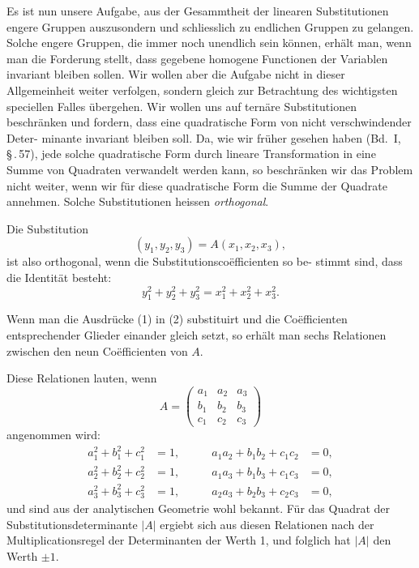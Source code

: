 \documentclass[12pt,a4paper]{article}
\theoremstyle{plain}
\theoremstyle{definition}
\theoremstyle{remark}
\begin{document}
Es ist nun unsere Aufgabe, aus der Gesammtheit der linearen
Substitutionen engere Gruppen auszusondern und schliesslich
zu endlichen Gruppen zu gelangen. Solche engere Gruppen, die
immer noch unendlich sein k\"onnen, erh\"alt man, wenn man die
Forderung stellt, dass gegebene homogene Functionen der
Variablen invariant bleiben sollen. Wir wollen aber die Aufgabe
nicht in dieser Allgemeinheit weiter verfolgen, sondern gleich
zur Betrachtung des wichtigsten speciellen Falles \"ubergehen. Wir
wollen uns auf tern\"are Substitutionen beschr\"anken und fordern,
dass eine quadratische Form von nicht verschwindender Deter-
minante invariant bleiben soll. Da, wie wir fr\"uher gesehen
haben (Bd.~I, \S\,.\,57), jede solche quadratische Form durch lineare
Transformation in eine Summe von Quadraten verwandelt werden
kann, so beschr\"anken wir das Problem nicht weiter, wenn wir
f\"ur diese quadratische Form die Summe der Quadrate annehmen.
Solche Substitutionen heissen \emph{orthogonal}.

Die Substitution
\begin{equation}\label{eq:48_1}
(y_1, y_2, y_3) = A(x_1, x_2, x_3),\tag{1}
\end{equation}
 ist also orthogonal, wenn die Substitutionsco\"efficienten so be-
stimmt sind, dass die Identit\"at besteht:
\begin{equation}\label{eq:48_2}
y_1^2 + y_2^2 + y_3^2 = x_1^2 + x_2^2 + x_3^2.\tag{2}
\end{equation}

Wenn man die Ausdr\"ucke (1) in (2) substituirt und die
Co\"efficienten entsprechender Glieder einander gleich setzt, so
erh\"alt man sechs Relationen zwischen den neun Co\"efficienten
von $A$.

Diese Relationen lauten, wenn
\begin{equation}\label{eq:48_3}
A = \begin{pmatrix}
a_1 & a_2 & a_3\\
b_1 & b_2 & b_3\\
c_1 & c_2 & c_3
\end{pmatrix}\tag{3}
\end{equation}
angenommen wird:
\begin{equation}\label{eq:48_4}
\begin{aligned}
a_1^2 + b_1^2 + c_1^2 &= 1,\qquad & a_1a_2 + b_1b_2 + c_1c_2 &= 0,\\
a_2^2 + b_2^2 + c_2^2 &= 1,\qquad & a_1a_3 + b_1b_3 + c_1c_3 &= 0,\\
a_3^2 + b_3^2 + c_3^2 &= 1,\qquad & a_2a_3 + b_2b_3 + c_2c_3 &= 0,
\end{aligned}\tag{4}
\end{equation}
und sind aus der analytischen Geometrie wohl bekannt. F\"ur das
Quadrat der Substitutionsdeterminante $|A|$ ergiebt sich aus diesen
Relationen nach der Multiplicationsregel der Determinanten der
Werth 1, und folglich hat $|A|$ den Werth $\pm 1$.
\end{document}
